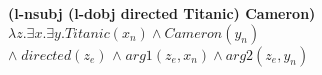 \documentclass{article}
\begin{document}
\thispagestyle{empty}
\begin{center}
{\textbf{(l-nsubj (l-dobj directed Titanic) Cameron)}\\ \vspace{0.2cm}$\lambda z. \exists x.\exists y. Titanic(x_n) \wedge Cameron(y_n)$ \\ $\wedge\; directed(z_e)$ 
$\wedge\; arg1(z_e, x_n) \wedge arg2(z_e, y_n)$} \\
\vspace{0.2cm}
\end{center}
\end{document}
